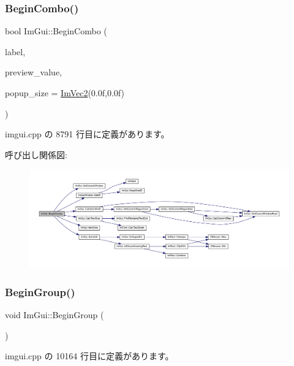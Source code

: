 \subsubsection{\texorpdfstring{Begin\+Combo()}{BeginCombo()}}
{\footnotesize\ttfamily bool Im\+Gui\+::\+Begin\+Combo (\begin{DoxyParamCaption}\item[{const char $\ast$}]{label,  }\item[{const char $\ast$}]{preview\+\_\+value,  }\item[{\mbox{\hyperlink{struct_im_vec2}{Im\+Vec2}}}]{popup\+\_\+size = {\ttfamily \mbox{\hyperlink{struct_im_vec2}{Im\+Vec2}}(0.0f,0.0f)} }\end{DoxyParamCaption})}



 imgui.\+cpp の 8791 行目に定義があります。

呼び出し関係図\+:\nopagebreak
\begin{figure}[H]
\begin{center}
\leavevmode
\includegraphics[width=350pt]{namespace_im_gui_a08acc516e0de3cbb99f00774778a440a_cgraph}
\end{center}
\end{figure}
\mbox{\label{namespace_im_gui_a42407e196b7ed2a8755bff28aae9805f}} 
\subsubsection{\texorpdfstring{Begin\+Group()}{BeginGroup()}}
{\footnotesize\ttfamily void Im\+Gui\+::\+Begin\+Group (\begin{DoxyParamCaption}{ }\end{DoxyParamCaption})}



 imgui.\+cpp の 10164 行目に定義があります。

